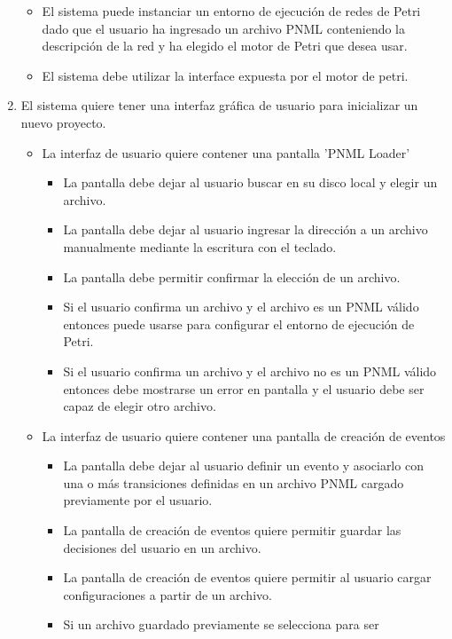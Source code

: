 \begin{enumerate}
\begin{itemize}
	    \item El sistema puede instanciar un entorno de ejecución de redes de
	    Petri dado que el usuario ha ingresado un archivo PNML conteniendo la
	    descripción de la red y ha elegido el motor de Petri que desea usar.
	    \item El sistema debe utilizar la interface expuesta por el motor de
	    petri.
	\end{itemize}
	\item El sistema quiere tener una interfaz gráfica de usuario para inicializar
	un nuevo proyecto.
	\begin{itemize}
	    \item La interfaz de usuario quiere contener una pantalla 'PNML Loader'
	    	\begin{itemize}
	    	    \item La pantalla debe dejar al usuario buscar en su disco local y
	    	    elegir un archivo.
	    	    \item La pantalla debe dejar al usuario ingresar la dirección a un
	    	    archivo manualmente mediante la escritura con el teclado.
	    	    \item La pantalla debe permitir confirmar la elección de un archivo.
	    	    \item Si el usuario confirma un archivo y el archivo es un PNML válido
	    	    entonces puede usarse para configurar el entorno de ejecución de
	    	    Petri.
	    	    \item Si el usuario confirma un archivo y el archivo no es un PNML
	    	    válido entonces debe mostrarse un error en pantalla y el usuario debe
	    	    ser capaz de elegir otro archivo.
	    	\end{itemize}
	    \item La interfaz de usuario quiere contener una pantalla de creación de
	    eventos
	    \begin{itemize}
	    	    \item La pantalla debe dejar al usuario definir un evento y asociarlo
	    	    con una o más transiciones definidas en un archivo PNML cargado
	    	    previamente por el usuario.
	    	    \item La pantalla de creación de eventos quiere permitir guardar las
	    	    decisiones del usuario en un archivo.
	    	    \item La pantalla de creación de eventos quiere permitir al usuario
	    	    cargar configuraciones a partir de un archivo.
	    	    \item Si un archivo guardado previamente se selecciona para ser

\end{itemize}
\end{itemize}
\end{enumerate}
